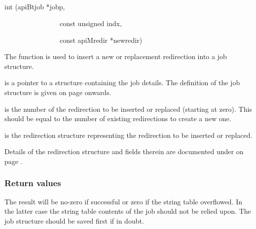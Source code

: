 \subsection{\funcnameXBputredir{}}

\begin{expara}

int \funcnameXBputredir{}(apiBtjob *jobp,

\ \ \ \ \ \ \ \ \ \ \ \ \ \ \ \ const unsigned indx,

\ \ \ \ \ \ \ \ \ \ \ \ \ \ \ \ const apiMredir *newredir)

\end{expara}

The function \funcXBputredir{} is used to insert a new
or replacement redirection into a job structure.

 is a pointer to a structure containing the
job details. The definition of the job structure is given on page
\pageref{bkm:Jobstructure} onwards.

 is the number of the redirection to be
inserted or replaced (starting at zero). This should be equal to the
number of existing redirections to create a new one.

 is the redirection structure
representing the redirection to be inserted or replaced.

Details of the redirection structure and fields therein are documented
under \progname{\funcnameXBgetredir{} }on page
\pageref{bkm:redirstruct}.

\subsubsection{Return values}
The result will be no-zero if successful or zero if the string table
overflowed. In the latter case the string table contents of the job
should not be relied upon. The job structure should be saved first if
in doubt.

